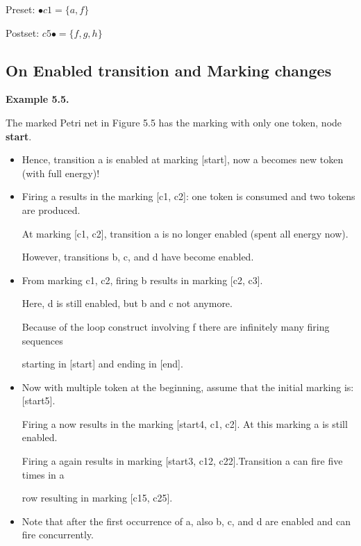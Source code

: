 \documentclass[a4paper]{article}
\begin{document}
Preset: $\bullet c1 = \{a, f\}$\par
Postset: $c5\bullet = \{f, g, h\}$\par

\subsection{On Enabled transition and Marking changes}

\par\null\par

\textbf{Example 5.5.}
\par\null\par
The marked Petri net in Figure 5.5 has the marking with only one token, node \textbf{start}.\par
\begin{itemize}
    \item Hence, transition a is enabled at marking [start], now a becomes new token (with full energy)!
    \item Firing a results in the marking [c1, c2]: one token is consumed and two tokens are produced.\par
    At marking [c1, c2], transition a is no longer enabled (spent all energy now).\par
    However, transitions b, c, and d have become enabled.
    \item From marking c1, c2, firing b results in marking [c2, c3].\par
    Here, d is still enabled, but b and c not anymore.\par
    Because of the loop construct involving f there are infinitely many firing sequences\par
    starting in [start] and ending in [end].
    \item Now with multiple token at the beginning, assume that the initial marking is: [start5].\par
    Firing a now results in the marking [start4, c1, c2]. At this marking a is still enabled.\par
    Firing a again results in marking [start3, c12, c22].Transition a can fire five times in a\par row resulting in marking [c15, c25].
    \item Note that after the first occurrence of a, also b, c, and d are enabled and can fire concurrently.
\end{itemize}

\par\null\par
\end{document}
